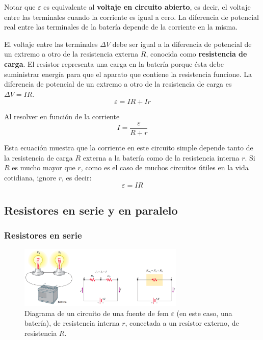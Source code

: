     \PN Notar que $\varepsilon$ es equivalente al \textbf{voltaje en circuito abierto}, es decir, el voltaje entre las
    terminales cuando la corriente es igual a cero. La diferencia de potencial real entre las terminales de la batería
    depende de la corriente en la misma.

    \VS
    \PN El voltaje entre las terminales $\Delta V$ debe ser igual a la diferencia de potencial de un extremo a otro de la
    resistencia externa $R$, conocida como \textbf{resistencia de carga}. El resistor representa una carga en la batería
    porque ésta debe suministrar energía para que el aparato que contiene la resistencia funcione. La diferencia de
    potencial de un extremo a otro de la resistencia de carga es $\Delta V = IR$.
    \begin{equation*}
      \varepsilon = IR + Ir
    \end{equation*}

    \PN Al resolver en función de la corriente
    \begin{equation*}
      I = \frac{\varepsilon}{R + r}
    \end{equation*}

    \PN Esta ecuación muestra que la corriente en este circuito simple depende tanto de la resistencia de carga $R$
    externa a la batería como de la resistencia interna $r$. Si $R$ es mucho mayor que $r$, como es el caso de muchos
    circuitos útiles en la vida cotidiana, ignore $r$, es decir:
    \begin{equation*}
      \varepsilon = IR
    \end{equation*}

  \subsection{Resistores en serie y en paralelo}
    \subsubsection{Resistores en serie}

      \begin{figure}[H]
      \centering
        \includegraphics[width=0.7\textwidth]{4/figure_11}
        \caption{Diagrama de un circuito de una fuente de fem $\varepsilon$ (en este caso, una batería), de resistencia
        interna $r$, conectada a un resistor externo, de resistencia $R$.}
      \end{figure}

